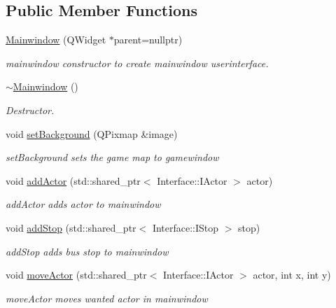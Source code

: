 \subsection*{Public Member Functions}
\begin{DoxyCompactItemize}
\item 
\hyperlink{class_student_side_1_1_mainwindow_a3be9249fcf6ae0439eab93841d84a4bc}{Mainwindow} (Q\-Widget $\ast$parent=nullptr)
\begin{DoxyCompactList}\small\item\em mainwindow constructor to create mainwindow userinterface. \end{DoxyCompactList}\item 
\hyperlink{class_student_side_1_1_mainwindow_abe12f13a949502ef80a5a4d8a649e410}{$\sim$\-Mainwindow} ()
\begin{DoxyCompactList}\small\item\em Destructor. \end{DoxyCompactList}\item 
void \hyperlink{class_student_side_1_1_mainwindow_a7cc5ee10d853012e479510ee80443d13}{set\-Background} (Q\-Pixmap \&image)
\begin{DoxyCompactList}\small\item\em set\-Background sets the game map to gamewindow \end{DoxyCompactList}\item 
void \hyperlink{class_student_side_1_1_mainwindow_aa6c19fef8cc6731de13b45764277ec67}{add\-Actor} (std\-::shared\-\_\-ptr$<$ Interface\-::\-I\-Actor $>$ actor)
\begin{DoxyCompactList}\small\item\em add\-Actor adds actor to mainwindow \end{DoxyCompactList}\item 
void \hyperlink{class_student_side_1_1_mainwindow_a27478d3419382f2bb8381c7c5af5c8ee}{add\-Stop} (std\-::shared\-\_\-ptr$<$ Interface\-::\-I\-Stop $>$ stop)
\begin{DoxyCompactList}\small\item\em add\-Stop adds bus stop to mainwindow \end{DoxyCompactList}\item 
void \hyperlink{class_student_side_1_1_mainwindow_a7c75210e41e3f9f962b77ebeaaa60811}{move\-Actor} (std\-::shared\-\_\-ptr$<$ Interface\-::\-I\-Actor $>$ actor, int x, int y)
\begin{DoxyCompactList}\small\item\em move\-Actor moves wanted actor in mainwindow \end{DoxyCompactList}\item 

\end{DoxyCompactItemize}
